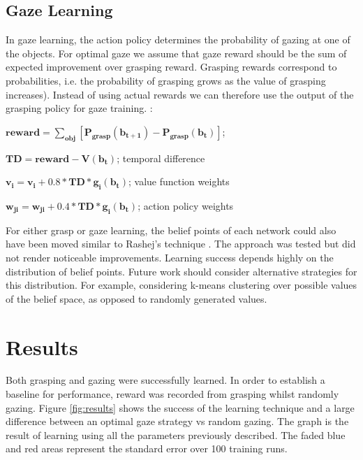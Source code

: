 \documentclass[11]{article}
\begin{document}
\subsection{Gaze Learning}
In gaze learning, the action policy determines the probability of gazing at one of the objects. For optimal gaze we assume that gaze reward should be the sum of expected improvement over grasping reward. Grasping rewards correspond to probabilities, i.e. the probability of grasping grows as the value of grasping increases). Instead of using actual rewards we can therefore use the output of the grasping policy for gaze training.  : 
\begin{list}{}{}
  \item $\pmb{reward = \sum_{obj}[P_{grasp}(b_{t+1}) -  P_{grasp}(b_t)] }$; 
  \item $\pmb{TD = reward - V(b_t)}$; temporal difference
  \item $\pmb{ v_i = v_i + 0.8 * TD * g_i(b_t)}$; value function weights
  \item $\pmb{w_{ji} = w_{ji}+ 0.4 * TD * g_i(b_t)}$; action policy weights
\end{list}  

For either grasp or gaze learning, the belief points of each network could also have been moved similar to Rashej's technique \cite{rashejrao}. The approach was tested but did not render noticeable improvements. Learning success depends highly on the distribution of belief points. Future work should consider alternative strategies for this distribution. For example, considering k-means clustering over possible values of the belief space, as opposed to randomly generated values.

\pagebreak

\section{Results}
Both grasping and gazing were successfully learned. In order to establish a baseline for performance, reward was recorded from grasping whilst randomly gazing. 
Figure \ref{fig:results} shows the success of the learning technique and a large difference between an optimal gaze strategy vs random gazing. The graph is the result of learning using all the parameters previously described. The faded blue and red areas represent the standard error over 100 training runs.
\end{document}
